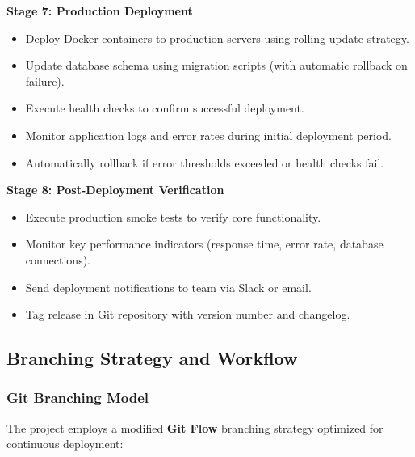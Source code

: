 \documentclass[12pt,a4paper]{article}
\begin{document}
\begin{tcolorbox}[colback=lightgray, colframe=secondaryblue, boxrule=0.8pt, arc=3pt, left=10pt, right=10pt, top=8pt, bottom=8pt]
\vspace{0.5em}

\textbf{Stage 7: Production Deployment}

\begin{itemize}[leftmargin=2em, itemsep=6pt]
    \item Deploy Docker containers to production servers using rolling update strategy.
    \item Update database schema using migration scripts (with automatic rollback on failure).
    \item Execute health checks to confirm successful deployment.
    \item Monitor application logs and error rates during initial deployment period.
    \item Automatically rollback if error thresholds exceeded or health checks fail.
\end{itemize}

\vspace{0.5em}

\textbf{Stage 8: Post-Deployment Verification}

\begin{itemize}[leftmargin=2em, itemsep=6pt]
    \item Execute production smoke tests to verify core functionality.
    \item Monitor key performance indicators (response time, error rate, database connections).
    \item Send deployment notifications to team via Slack or email.
    \item Tag release in Git repository with version number and changelog.
\end{itemize}

\end{tcolorbox}

\subsection{Branching Strategy and Workflow}

\subsubsection{Git Branching Model}

The project employs a modified \textbf{Git Flow} branching strategy optimized for continuous deployment:
\end{document}
